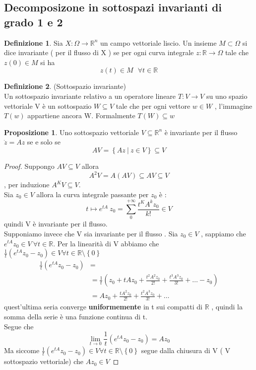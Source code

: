 \documentclass{article}
\theoremstyle{definition}
\newtheorem{definizione}{Definizione}[section]
\newtheorem*{proposizione}{Proposizione}
\newcommand{\R}{\mathbb{R}}
\newcommand{\Rn}{\R^n}
\begin{document}
\subsection{Decomposizone in sottospazi invarianti di grado 1 e 2 }
\begin{definizione}
	Sia $X : \Omega \rightarrow \Rn$ un campo vettoriale liscio. Un insieme $ M \subset \Omega$ si dice invariante ( per il flusso di X ) se per ogni curva integrale $z: \R \rightarrow \Omega$ tale che $z(0)\in M$ si ha $$z(t)\in M \ \ \ \forall t \in \R$$
\end{definizione}
\begin{definizione}(Sottospazio invariante)\\
	Un sottospazio invariante relativo a un operatore lineare $T:V \rightarrow V $ su uno spazio vettoriale V è un sottospazio $W \subseteq V$ tale che per ogni vettore $w \in W $ , l'immagine $T(w)$ appartiene ancora W. Formalmente $T(W)\subseteq w$
\end{definizione}
\begin{proposizione}
	Uno sottospazio vettoriale $V \subseteq \Rn$  è invariante per il flusso $\dot{z}=Az$  se e solo se $$AV=\left\{Az \ | \ z \in V \right\}\subseteq V$$
\end{proposizione}
\begin{proof}
	Suppongo $AV \subseteq V $ allora $$A^2V=A(AV)\subseteq AV \subseteq V$$ , per induzione $A^KV\subseteq V$.\\
	Sia $z_0 \in V $ allora la curva integrale passante per $z_0$ è : 
	$$t \mapsto e^{tA}\ z_0 = \sum_{0}^{+\infty}\frac{t^K A^k z_0}{k!} \in V $$
	quindi V è invariante per il flusso.	\\
	Supponiamo invece che V sia invariante per il flusso . Sia $z_0 \in V $ , sappiamo che $e^{tA}z_0 \in V  \ \forall t \in \R $. Per la linearità di V  abbiamo che $\frac{1}{t} (e^{tA}z_0 -z_0)  \in V \forall t \in \R\setminus\left\{0\right\}$
	\begin{align*}
\frac{1}{t} (e^{tA}z_0 -z_0) &= \\
&=\frac{1}{t} \left(z_0 + tAz_0+\frac{t^2 A^2 z_0}{2!}+\frac{t^3 A^3 z_0}{3!}+ \dots - z_0\right)\\
&=Az_0 + \frac{t A^2 z_0}{2!} + \frac{t^2 A^3 z_0}{3!}+ \dots
	\end{align*}
	quest'ultima seria converge \textbf{uniformemente} in t sui compatti di $\R$ , quindi la somma della serie è una funzione continua di t.\\
	Segue che $$\lim_{t \rightarrow 0}\frac{1}{t}(e^{tA}z_0 -z_0)=Az_0$$
	Ma siccome $\frac{1}{t} (e^{tA}z_0 -z_0)  \in V \forall t \in \R\setminus\left\{0\right\}$ segue dalla chiusura di V ( V sottospazio vettoriale) che $Az_0 \in V$
\end{proof}
\end{document}
